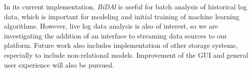 \documentclass{article}
\begin{document}
In its current implementation, \emph{BiDAl} is useful for batch analysis of historical log data, which is important for modeling and initial training of machine learning algorithms. However, live log data analysis is also of interest, so we are investigating the addition of an interface to streaming data sources to our platform. Future work also includes implementation of other storage systems, especially to include non-relational models. Improvement of the GUI and general user experience will also be pursued.




      


\end{document}
